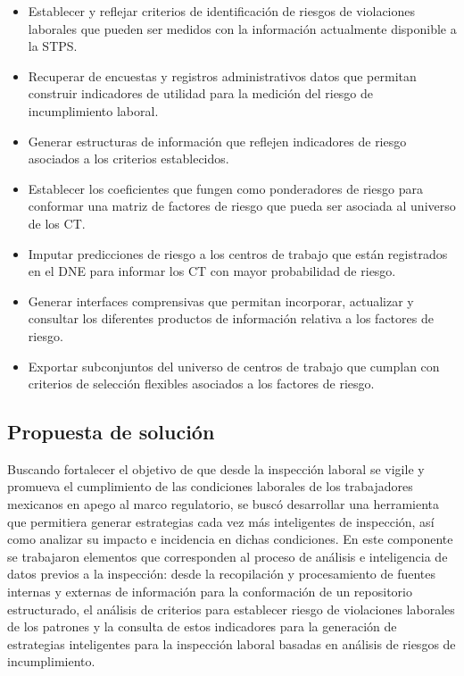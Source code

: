 \documentclass[
]{article}
\providecommand{\tightlist}{%
  \setlength{\itemsep}{0pt}\setlength{\parskip}{0pt}}
\begin{document}
\begin{itemize}
\tightlist
\item
  Establecer y reflejar criterios de identificación de riesgos de violaciones laborales que pueden ser medidos con la información actualmente disponible a la STPS.
\item
  Recuperar de encuestas y registros administrativos datos que permitan construir indicadores de utilidad para la medición del riesgo de incumplimiento laboral.
\item
  Generar estructuras de información que reflejen indicadores de riesgo asociados a los criterios establecidos.
\item
  Establecer los coeficientes que fungen como ponderadores de riesgo para conformar una matriz de factores de riesgo que pueda ser asociada al universo de los CT.
\item
  Imputar predicciones de riesgo a los centros de trabajo que están registrados en el DNE para informar los CT con mayor probabilidad de riesgo.
\item
  Generar interfaces comprensivas que permitan incorporar, actualizar y consultar los diferentes productos de información relativa a los factores de riesgo.
\item
  Exportar subconjuntos del universo de centros de trabajo que cumplan con criterios de selección flexibles asociados a los factores de riesgo.
\end{itemize}

\hypertarget{propuestasolucion}{%
\subsection{Propuesta de solución}\label{propuestasolucion}}

Buscando fortalecer el objetivo de que desde la inspección laboral se vigile y promueva el cumplimiento de las condiciones laborales de los trabajadores mexicanos en apego al marco regulatorio, se buscó desarrollar una herramienta que permitiera generar estrategias cada vez más inteligentes de inspección, así como analizar su impacto e incidencia en dichas condiciones. En este componente se trabajaron elementos que corresponden al proceso de análisis e inteligencia de datos previos a la inspección: desde la recopilación y procesamiento de fuentes internas y externas de información para la conformación de un repositorio estructurado, el análisis de criterios para establecer riesgo de violaciones laborales de los patrones y la consulta de estos indicadores para la generación de estrategias inteligentes para la inspección laboral basadas en análisis de riesgos de incumplimiento.
\end{document}
